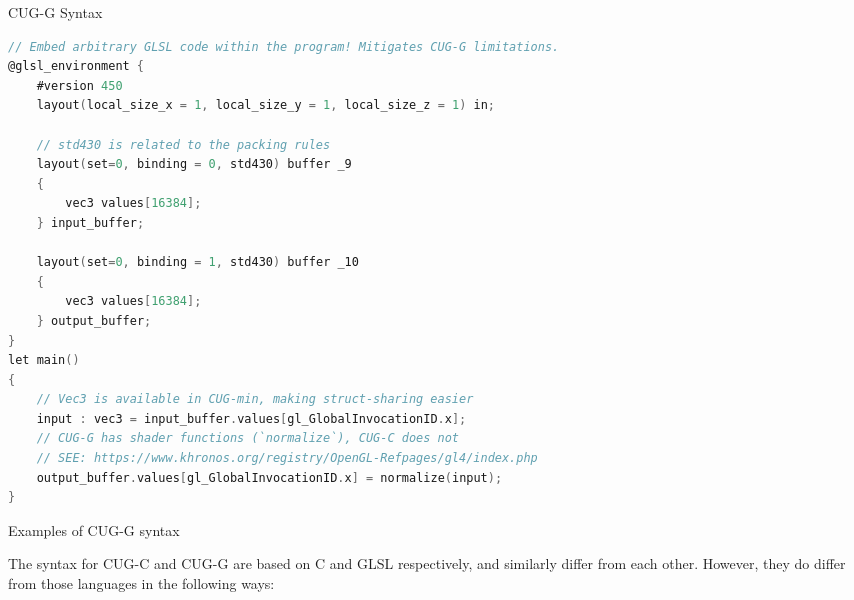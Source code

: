 \documentclass[a4paper,12pt,twoside,openright]{report}
\begin{document}
\begin{lstfloat}
\begin{center} CUG-G Syntax\end{center}
\begin{lstlisting}[language=C]
// Embed arbitrary GLSL code within the program! Mitigates CUG-G limitations.
@glsl_environment {
    #version 450
    layout(local_size_x = 1, local_size_y = 1, local_size_z = 1) in;

    // std430 is related to the packing rules
    layout(set=0, binding = 0, std430) buffer _9
    {
        vec3 values[16384];
    } input_buffer;

    layout(set=0, binding = 1, std430) buffer _10
    {
        vec3 values[16384];
    } output_buffer;
}
let main()
{
    // Vec3 is available in CUG-min, making struct-sharing easier
    input : vec3 = input_buffer.values[gl_GlobalInvocationID.x];
    // CUG-G has shader functions (`normalize`), CUG-C does not
    // SEE: https://www.khronos.org/registry/OpenGL-Refpages/gl4/index.php
    output_buffer.values[gl_GlobalInvocationID.x] = normalize(input);
}
\end{lstlisting}
\caption{Examples of CUG-G syntax}
\label{lst:cug_g_syntax}
\end{lstfloat}


The syntax for CUG-C and CUG-G are based on C and GLSL respectively, and
similarly differ from each other. However, they do differ from those languages
in the following ways:
\end{document}
